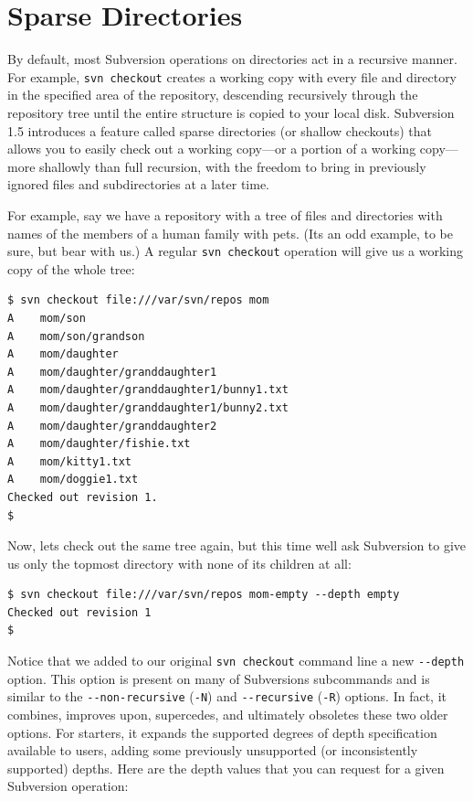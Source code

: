 \section{Sparse Directories}\label{svn.advanced.sparsedirs}

By default, most Subversion operations on directories act in a recursive
manner. For example, \texttt{svn\ checkout} creates a working copy with
every file and directory in the specified area of the repository,
descending recursively through the repository tree until the entire
structure is copied to your local disk. Subversion 1.5 introduces a
feature called sparse directories (or shallow checkouts) that allows you
to easily check out a working copy---or a portion of a working
copy---more shallowly than full recursion, with the freedom to bring in
previously ignored files and subdirectories at a later time.

For example, say we have a repository with a tree of files and
directories with names of the members of a human family with pets.
(It\textquotesingle s an odd example, to be sure, but bear with us.) A
regular \texttt{svn\ checkout} operation will give us a working copy of
the whole tree:

\begin{verbatim}
$ svn checkout file:///var/svn/repos mom
A    mom/son
A    mom/son/grandson
A    mom/daughter
A    mom/daughter/granddaughter1
A    mom/daughter/granddaughter1/bunny1.txt
A    mom/daughter/granddaughter1/bunny2.txt
A    mom/daughter/granddaughter2
A    mom/daughter/fishie.txt
A    mom/kitty1.txt
A    mom/doggie1.txt
Checked out revision 1.
$
\end{verbatim}

Now, let\textquotesingle s check out the same tree again, but this time
we\textquotesingle ll ask Subversion to give us only the topmost
directory with none of its children at all:

\begin{verbatim}
$ svn checkout file:///var/svn/repos mom-empty --depth empty
Checked out revision 1
$
\end{verbatim}

Notice that we added to our original \texttt{svn\ checkout} command line
a new \texttt{-\/-depth} option. This option is present on many of
Subversion\textquotesingle s subcommands and is similar to the
\texttt{-\/-non-recursive} (\texttt{-N}) and \texttt{-\/-recursive}
(\texttt{-R}) options. In fact, it combines, improves upon, supercedes,
and ultimately obsoletes these two older options. For starters, it
expands the supported degrees of depth specification available to users,
adding some previously unsupported (or inconsistently supported) depths.
Here are the depth values that you can request for a given Subversion
operation:

